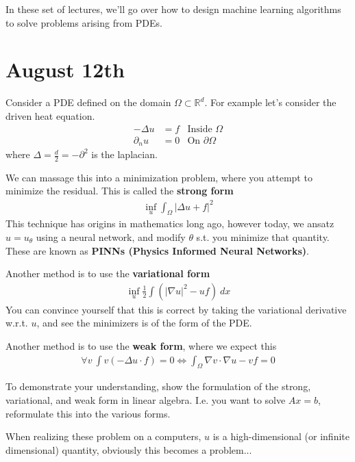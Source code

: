 In these set of lectures, we'll go over how to design machine learning algorithms to solve problems arising from PDEs.

\section{August 12th}
Consider a PDE defined on the domain $\Omega \subset \mathbb R^d$. For example let's consider the driven heat equation.
\begin{align}
	-\Delta u &= f & \text{Inside } \Omega\\
	\partial_n u  &= 0 & \text{On } \partial \Omega
\end{align}
where $\Delta = \frac{d}{2} = - \partial^2$ is the laplacian.

We can massage this into a minimization problem, where you attempt to minimize the residual. This is called the \textbf{strong form}
\begin{align}
	\inf_u \int_\Omega |\Delta u + f|^2 
\end{align}
This technique has origins in mathematics long ago, however today, we ansatz $u=u_\theta$ using a neural network, and modify $\theta$ s.t. you minimize that quantity. These are known as \textbf{PINNs (Physics Informed Neural Networks)}.

Another method is to use the \textbf{variational form}
\begin{align}
	\inf_u \frac{1}{2} \int (|\nabla u|^2 - u f) ~dx 
\end{align}
You can convince yourself that this is correct by taking the variational derivative w.r.t. $u$, and see the minimizers is of the form of the PDE.

Another method is to use the \textbf{weak form}, where we expect this
\begin{align}
	\forall v~ \int v (-\Delta u \cdot f) = 0 \iff \int_\Omega \nabla v \cdot \nabla u - v f = 0
\end{align}

\begin{problem}
	To demonstrate your understanding, show the formulation of the strong, variational, and weak form in linear algebra. I.e. you want to solve $A x = b$, reformulate this into the various forms. 
\end{problem}

When realizing these problem on a computers, $u$ is a high-dimensional (or infinite dimensional) quantity, obviously this becomes a problem...

